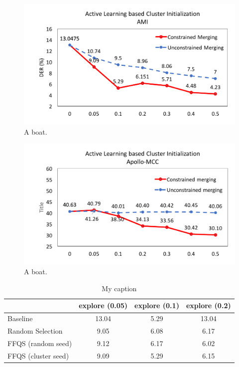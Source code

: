 \documentclass[journal]{IEEEtran}
\begin{document}
\begin{figure}
	\includegraphics[width=\linewidth]{figs/exp1_1}
	\caption{A boat.}
	\label{fig:boat1}
\end{figure}
\begin{figure}
	\includegraphics[width=\linewidth]{figs/exp1_2}
	\caption{A boat.}
	\label{fig:boat1}
\end{figure}

\begin{table}[]
	\centering
	\caption{My caption}
	\label{my-label}
	\small
	\begin{tabular}{@{}lccc@{}}
		\toprule
		& explore (0.05)  & explore (0.1)  & explore (0.2)   \\ \midrule
		Baseline            & 13.04 & 5.29 & 13.04 \\ \midrule
		Random Selection    & 9.05  & 6.08 & 6.17  \\ \midrule
		FFQS (random seed)  & 9.12  & 6.17 & 6.02  \\ \midrule
		FFQS (cluster seed) & 9.09  & 5.29 & 6.15  \\ \bottomrule
	\end{tabular}
\end{table}
\end{document}

